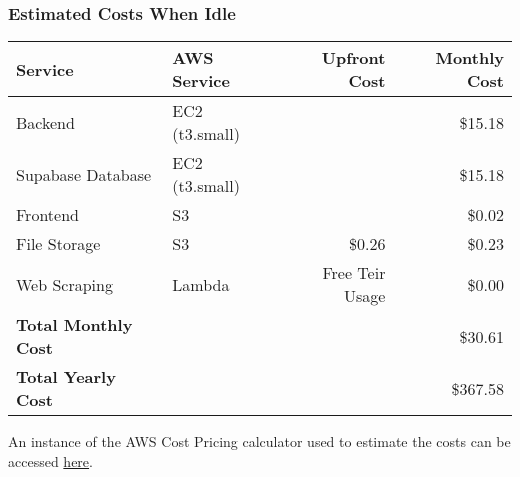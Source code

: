 \documentclass[a4paper, 11pt]{article}
\newcommand{\estimatedCostInIdleURL}{https://calculator.aws/\#/estimate?id=0f82526574f81e22825462ca5893dc9b7381e9a7}
\begin{document}
\begin{table}[htbp]
    \subsubsection*{Estimated Costs When Idle}

    \newlength{\tableRowSpacing}
    \setlength{\tableRowSpacing}{3pt}   %

    \centering
    \begin{tabularx}{\textwidth}{XXrr}
    \toprule
    Service             & AWS Service       & Upfront Cost & Monthly Cost \\
    \midrule
    Backend             & EC2 (t3.small)    &               & \$15.18     \\ \addlinespace[\tableRowSpacing]
    Supabase Database   & EC2 (t3.small)    &               & \$15.18     \\ \addlinespace[\tableRowSpacing]
    Frontend            & S3                &               & \$0.02      \\ \addlinespace[\tableRowSpacing]
    File Storage        & S3                & \$0.26        & \$0.23      \\ \addlinespace[\tableRowSpacing]
    Web Scraping        & Lambda            & Free Teir Usage & \$0.00    \\ 
    \midrule
    \textbf{Total Monthly Cost}   &&& \$30.61 \\    \addlinespace[\tableRowSpacing]
    \textbf{Total Yearly Cost}   &&& \$367.58 \\
    \bottomrule
    \end{tabularx}
    
    \raggedright \vspace{1em}
    An instance of the AWS Cost Pricing calculator used to estimate the costs can be accessed \href{\estimatedCostInIdleURL}{here}.
\end{table}

\end{document}
